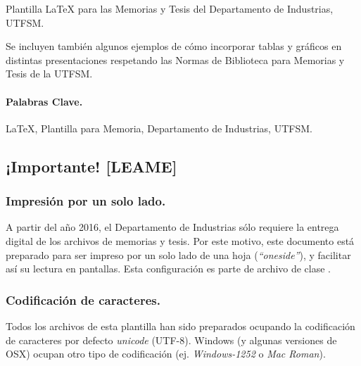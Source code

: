 
Plantilla \LaTeX{} para las Memorias y Tesis del Departamento de Industrias, UTFSM.

Se incluyen también algunos ejemplos de cómo incorporar tablas y gráficos en distintas presentaciones respetando las Normas de Biblioteca para Memorias y Tesis de la UTFSM.

\vspace{10mm}

\paragraph{Palabras Clave.}
\LaTeX{}, Plantilla para Memoria, Departamento de Industrias, UTFSM.

\vspace*{1cm}
\subsection*{¡Importante! [LEAME]}

\subsubsection*{Impresión por un solo lado.}
A partir del año 2016, el Departamento de Industrias sólo requiere la entrega digital de los archivos de memorias y tesis. Por este motivo, este documento está preparado para ser impreso por un solo lado de una hoja (\emph{``oneside''}), y facilitar así su lectura en pantallas. Esta configuración es parte de archivo de clase .

\subsubsection*{Codificación de caracteres.}

Todos los archivos  de esta plantilla han sido preparados ocupando la codificación de caracteres por defecto \emph{unicode} (UTF-8). Windows (y algunas versiones de OSX) ocupan otro tipo de codificación (ej. \emph{Windows-1252} o \emph{Mac Roman}).

